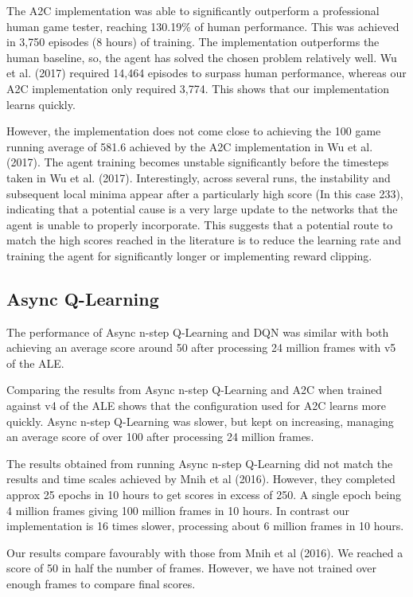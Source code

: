 \documentclass{article}
\begin{document}
The A2C implementation was able to significantly outperform a professional human game tester, reaching 130.19\% of human performance. This was achieved in 3,750 episodes (8 hours) of training. The implementation outperforms the human baseline, so, the agent has solved the chosen problem relatively well. Wu et al. (2017) required 14,464 episodes to surpass human performance, whereas our A2C implementation only required 3,774. This shows that our implementation learns quickly.

However, the implementation does not come close to achieving the 100 game running average of 581.6 achieved by the A2C implementation in Wu et al. (2017). The agent training becomes unstable significantly before the timesteps taken in Wu et al. (2017). Interestingly, across several runs, the instability and subsequent local minima appear after a particularly high score (In this case 233), indicating that a potential cause is a very large update to the networks that the agent is unable to properly incorporate. This suggests that a potential route to match the high scores reached in the literature is to reduce the learning rate and training the agent for significantly longer or implementing reward clipping.


\subsection{Async Q-Learning}

The performance of Async n-step Q-Learning and DQN was similar with both achieving an average score around 50 after processing 24 million frames with v5 of the ALE.

Comparing the results from Async n-step Q-Learning and A2C when trained against v4 of the ALE shows that the configuration used for A2C  learns more quickly. Async n-step Q-Learning was slower, but kept on increasing, managing an average score of over 100 after processing 24 million frames.

The results obtained from running Async n-step Q-Learning did not match the results and time scales achieved by Mnih et al (2016). However, they completed approx 25 epochs in 10 hours to get scores in excess of 250. A single epoch being 4 million frames giving 100 million frames in 10 hours. In contrast our implementation is 16 times slower, processing about 6 million frames in 10 hours.

Our results compare favourably with those from Mnih et al (2016). We reached a score of 50 in half the number of frames. However, we have not trained over enough frames to compare final scores.
\end{document}

